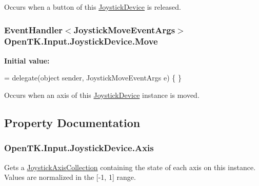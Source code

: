 Occurs when a button of this \hyperlink{class_open_t_k_1_1_input_1_1_joystick_device}{Joystick\-Device} is released. 

\hypertarget{class_open_t_k_1_1_input_1_1_joystick_device_ad9dcc4f6506c543d16e326c7ee08da39}{
\subsubsection[{Move}]{\setlength{\rightskip}{0pt plus 5cm}Event\-Handler$<${\bf Joystick\-Move\-Event\-Args}$>$ Open\-T\-K.\-Input.\-Joystick\-Device.\-Move}}\label{class_open_t_k_1_1_input_1_1_joystick_device_ad9dcc4f6506c543d16e326c7ee08da39}
{\bfseries Initial value\-:}
\begin{DoxyCode}
=
            delegate(\textcolor{keywordtype}{object} sender, JoystickMoveEventArgs e) \{ \}
\end{DoxyCode}


Occurs when an axis of this \hyperlink{class_open_t_k_1_1_input_1_1_joystick_device}{Joystick\-Device} instance is moved. 



\subsection{Property Documentation}
\hypertarget{class_open_t_k_1_1_input_1_1_joystick_device_a21ae34496707cad92024def6a122e878}{
\subsubsection[{Axis}]{ Open\-T\-K.\-Input.\-Joystick\-Device.\-Axis\hspace{0.3cm}{\ttfamily [get]}}}\label{class_open_t_k_1_1_input_1_1_joystick_device_a21ae34496707cad92024def6a122e878}


Gets a \hyperlink{class_open_t_k_1_1_input_1_1_joystick_axis_collection}{Joystick\-Axis\-Collection} containing the state of each axis on this instance. Values are normalized in the \mbox{[}-\/1, 1\mbox{]} range. 

